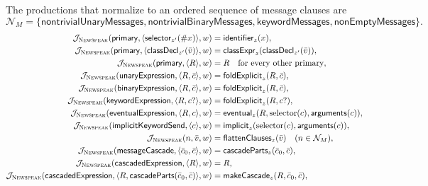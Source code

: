 The productions that normalize to an ordered sequence of message clauses are
\begin{equation}\label{eq:newspeak-message-sequence-names}
 \mathcal N_M=\{\mathsf{nontrivialUnaryMessages},
   \mathsf{nontrivialBinaryMessages},
   \mathsf{keywordMessages},\mathsf{nonEmptyMessages}\}.
\end{equation}
\begin{equation}\label{eq:newspeak-send-fold-actions}
\begin{aligned}
 \mathcal J_{\textsc{Newspeak}}(\mathsf{primary},
      \langle\mathsf{selector}_{z'}(\#x)\rangle,w)&=\mathsf{identifier}_{z}(x),\\
 \mathcal J_{\textsc{Newspeak}}(\mathsf{primary},
      \langle\mathsf{classDecl}_{z'}(\bar v)\rangle,w)&=
      \mathsf{classExpr}_{z}(\mathsf{classDecl}_{z'}(\bar v)),\\
 \mathcal J_{\textsc{Newspeak}}(\mathsf{primary},\langle R\rangle,w)&=R
      \quad\text{for every other primary},\\
 \mathcal J_{\textsc{Newspeak}}(\mathsf{unaryExpression},\langle R,\bar c\rangle,w)
   &=\mathsf{foldExplicit}_{z}(R,\bar c),\\
 \mathcal J_{\textsc{Newspeak}}(\mathsf{binaryExpression},\langle R,\bar c\rangle,w)
   &=\mathsf{foldExplicit}_{z}(R,\bar c),\\
 \mathcal J_{\textsc{Newspeak}}(\mathsf{keywordExpression},\langle R,c?\rangle,w)
   &=\mathsf{foldExplicit}_{z}(R,c?),\\
 \mathcal J_{\textsc{Newspeak}}(\mathsf{eventualExpression},\langle R,c\rangle,w)
   &=\mathsf{eventual}_{z}(R,\mathop{\mathrm{selector}}(c),\mathsf{arguments}(c)),\\
 \mathcal J_{\textsc{Newspeak}}(\mathsf{implicitKeywordSend},\langle c\rangle,w)
   &=\mathsf{implicit}_{z}(\mathop{\mathrm{selector}}(c),\mathsf{arguments}(c)),\\
 \mathcal J_{\textsc{Newspeak}}(n,\bar v,w)&=
      \mathsf{flattenClauses}_{z}(\bar v)
      \quad(n\in\mathcal N_M),\\
 \mathcal J_{\textsc{Newspeak}}(\mathsf{messageCascade},
      \langle\bar c_0,\bar c\rangle,w)
   &=\mathsf{cascadeParts}_{z}(\bar c_0,\bar c),\\
 \mathcal J_{\textsc{Newspeak}}(\mathsf{cascadedExpression},\langle R\rangle,w)&=R,\\
 \mathcal J_{\textsc{Newspeak}}(\mathsf{cascadedExpression},
      \langle R,\mathsf{cascadeParts}(\bar c_0,\bar c)\rangle,w)
   &=\mathsf{makeCascade}_{z}(R,\bar c_0,\bar c),\\
\end{aligned}
\end{equation}

